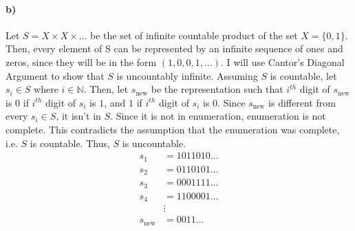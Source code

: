 \documentclass[12pt]{article}
\newcommand\+{\mkern2mu}
\begin{document}
\paragraph{b)}
Let $S = X \times X \times \dotso$ be the set of infinite countable product of the set $X = \{0, 1\}$.
Then, every element of S can be represented by an infinite sequence of ones and zeros, since they will be in the form $(1, 0, 0, 1, \dotso)$.
I will use Cantor's Diagonal Argument to show that $S$ is uncountably infinite.
Assuming $S$ is countable, let $s_i \in S$ where $i \in \mathbb{N}$.
Then, let $s_\text{new}$ be the representation such that $i^{th}$ digit of $s_\text{new}$ is $0$ if $i^{th}$ digit of $s_i$ is $1$, and $1$ if $i^{th}$ digit of $s_i$ is $0$.
Since $s_\text{new}$ is different from every $s_i \in S$, it isn't in $S$.
Since it is not in enumeration, enumeration is not complete.
This contradicts the assumption that the enumeration was complete, i.e. $S$ is countable.
Thus, $S$ is uncountable.
\begin{align*}
s_1 &= 1011010\dotso \\
s_2 &= 0110101\dotso \\
s_3 &= 0001111\dotso \\
s_4 &= 1100001\dotso \\
& \vdots \\
s_\text{new} &= 0011\dotso
\end{align*}

\newpage
\end{document}
